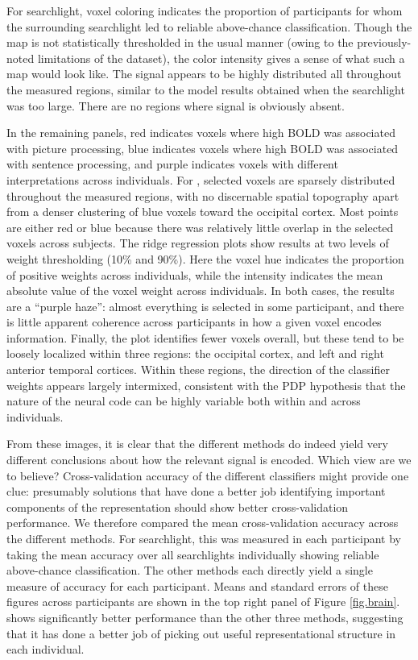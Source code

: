 For searchlight, voxel coloring indicates the proportion of participants for whom the surrounding searchlight led to reliable above-chance classification. Though the map is not statistically thresholded in the usual manner (owing to the previously-noted limitations of the dataset), the color intensity gives a sense of what such a map would look like. The signal appears to be highly distributed all throughout the measured regions, similar to the model results obtained when the searchlight was too large. There are no regions where signal is obviously absent. 

In the remaining panels, red indicates voxels where high BOLD was associated with picture processing, blue indicates voxels where high BOLD was associated with sentence processing, and purple indicates voxels with different interpretations across individuals. For {\lasso}, selected voxels are sparsely distributed throughout the measured regions, with no discernable spatial topography apart from a denser clustering of blue voxels toward the occipital cortex. Most points are either red or blue because there was relatively little overlap in the selected voxels across subjects. The ridge regression plots show results at two levels of weight thresholding (10\% and 90\%). Here the voxel hue indicates the proportion of positive weights across individuals, while the intensity indicates the mean absolute value of the voxel weight across individuals. In both cases, the results are a ``purple haze'': almost everything is selected in some participant, and there is little apparent coherence across participants in how a given voxel encodes information. Finally, the {\soslasso} plot identifies fewer voxels overall, but these tend to be loosely localized within three regions: the occipital cortex, and left and right anterior temporal cortices. Within these regions, the direction of the classifier weights appears largely intermixed, consistent with the PDP hypothesis that the nature of the neural code can be highly variable both within and across individuals.

From these images, it is clear that the different methods do indeed yield very different conclusions about how the relevant signal is encoded. Which view are we to believe? Cross-validation accuracy of the different classifiers might provide one clue: presumably solutions that have done a better job identifying important components of the representation should show better cross-validation performance. We therefore compared the mean cross-validation accuracy across the different methods. For searchlight, this was measured in each participant by taking the mean accuracy over all searchlights individually showing reliable above-chance classification. The other methods each directly yield a single measure of accuracy for each participant. Means and standard errors of these figures across participants are shown in the top right panel of Figure \ref{fig.brain}. {\soslasso} shows significantly better performance than the other three methods, suggesting that it has done a better job of picking out useful representational structure in each individual.

